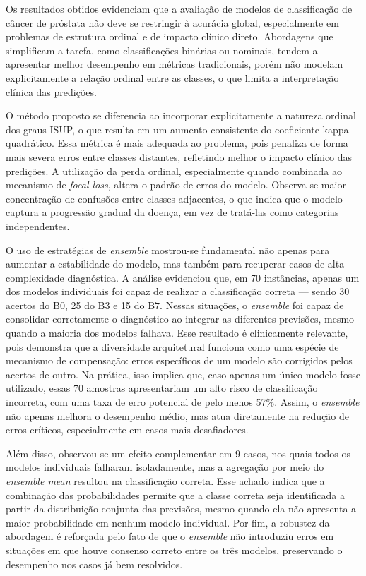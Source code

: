 Os resultados obtidos evidenciam que a avaliação de modelos de classificação de câncer de próstata não deve se restringir à acurácia global, especialmente em problemas de estrutura ordinal e de impacto clínico direto. Abordagens que simplificam a tarefa, como classificações binárias ou nominais, tendem a apresentar melhor desempenho em métricas tradicionais, porém não modelam explicitamente a relação ordinal entre as classes, o que limita a interpretação clínica das predições.

O método proposto se diferencia ao incorporar explicitamente a natureza ordinal dos graus ISUP, o que resulta em um aumento consistente do coeficiente kappa quadrático. Essa métrica é mais adequada ao problema, pois penaliza de forma mais severa erros entre classes distantes, refletindo melhor o impacto clínico das predições. A utilização da perda ordinal, especialmente quando combinada ao mecanismo de \textit{focal loss}, altera o padrão de erros do modelo. Observa-se maior concentração de confusões entre classes adjacentes, o que indica que o modelo captura a progressão gradual da doença, em vez de tratá-las como categorias independentes.

O uso de estratégias de \textit{ensemble} mostrou-se fundamental não apenas para aumentar a estabilidade do modelo, mas também para recuperar casos de alta complexidade diagnóstica. A análise evidenciou que, em 70 instâncias, apenas um dos modelos individuais foi capaz de realizar a classificação correta — sendo 30 acertos do $\text{B0}$, 25 do $\text{B3}$ e 15 do $\text{B7}$. Nessas situações, o \textit{ensemble} foi capaz de consolidar corretamente o diagnóstico ao integrar as diferentes previsões, mesmo quando a maioria dos modelos falhava. Esse resultado é clinicamente relevante, pois demonstra que a diversidade arquitetural funciona como uma espécie de mecanismo de compensação: erros específicos de um modelo são corrigidos pelos acertos de outro. Na prática, isso implica que, caso apenas um único modelo fosse utilizado, essas 70 amostras apresentariam um alto risco de classificação incorreta, com uma taxa de erro potencial de pelo menos 57\%. Assim, o \textit{ensemble} não apenas melhora o desempenho médio, mas atua diretamente na redução de erros críticos, especialmente em casos mais desafiadores.

Além disso, observou-se um efeito complementar em 9 casos, nos quais todos os modelos individuais falharam isoladamente, mas a agregação por meio do \textit{ensemble mean} resultou na classificação correta. Esse achado indica que a combinação das probabilidades permite que a classe correta seja identificada a partir da distribuição conjunta das previsões, mesmo quando ela não apresenta a maior probabilidade em nenhum modelo individual. Por fim, a robustez da abordagem é reforçada pelo fato de que o \textit{ensemble} não introduziu erros em situações em que houve consenso correto entre os três modelos, preservando o desempenho nos casos já bem resolvidos.

